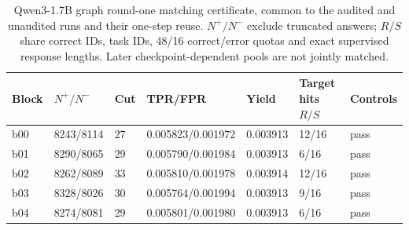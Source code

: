 \begin{table}[H]
\caption{Qwen3-1.7B graph round-one matching certificate, common to the audited and unaudited runs and their one-step reuse. $N^+/N^-$ exclude truncated answers; $R/S$ share correct IDs, task IDs, 48/16 correct/error quotas and exact supervised response lengths. Later checkpoint-dependent pools are not jointly matched.}
\label{tab:qwen-matching}
\centering\small\setlength{\tabcolsep}{3pt}
\begin{tabular}{@{}lllllll@{}}
\toprule
Block & $N^+/N^-$ & Cut & TPR/FPR & Yield & Target hits $R/S$ & Controls\\
\midrule
b00 & 8243/8114 & 27 & 0.005823/0.001972 & 0.003913 & 12/16 & pass\\
b01 & 8290/8065 & 29 & 0.005790/0.001984 & 0.003913 & 6/16 & pass\\
b02 & 8262/8089 & 33 & 0.005810/0.001978 & 0.003914 & 12/16 & pass\\
b03 & 8328/8026 & 30 & 0.005764/0.001994 & 0.003913 & 9/16 & pass\\
b04 & 8274/8081 & 29 & 0.005801/0.001980 & 0.003913 & 6/16 & pass\\
\bottomrule
\end{tabular}
\end{table}
